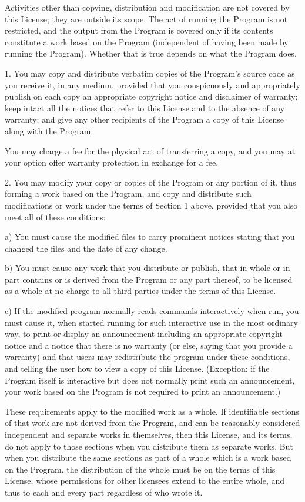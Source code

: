 \documentclass{doc}
\begin{document}
Activities other than copying, distribution and modification are not
covered by this License; they are outside its scope.  The act of
running the Program is not restricted, and the output from the Program
is covered only if its contents constitute a work based on the
Program (independent of having been made by running the Program).
Whether that is true depends on what the Program does.

  1. You may copy and distribute verbatim copies of the Program's
source code as you receive it, in any medium, provided that you
conspicuously and appropriately publish on each copy an appropriate
copyright notice and disclaimer of warranty; keep intact all the
notices that refer to this License and to the absence of any warranty;
and give any other recipients of the Program a copy of this License
along with the Program.

You may charge a fee for the physical act of transferring a copy, and
you may at your option offer warranty protection in exchange for a fee.

  2. You may modify your copy or copies of the Program or any portion
of it, thus forming a work based on the Program, and copy and
distribute such modifications or work under the terms of Section 1
above, provided that you also meet all of these conditions:

    a) You must cause the modified files to carry prominent notices
    stating that you changed the files and the date of any change.

    b) You must cause any work that you distribute or publish, that in
    whole or in part contains or is derived from the Program or any
    part thereof, to be licensed as a whole at no charge to all third
    parties under the terms of this License.

    c) If the modified program normally reads commands interactively
    when run, you must cause it, when started running for such
    interactive use in the most ordinary way, to print or display an
    announcement including an appropriate copyright notice and a
    notice that there is no warranty (or else, saying that you provide
    a warranty) and that users may redistribute the program under
    these conditions, and telling the user how to view a copy of this
    License.  (Exception: if the Program itself is interactive but
    does not normally print such an announcement, your work based on
    the Program is not required to print an announcement.)

These requirements apply to the modified work as a whole.  If
identifiable sections of that work are not derived from the Program,
and can be reasonably considered independent and separate works in
themselves, then this License, and its terms, do not apply to those
sections when you distribute them as separate works.  But when you
distribute the same sections as part of a whole which is a work based
on the Program, the distribution of the whole must be on the terms of
this License, whose permissions for other licensees extend to the
entire whole, and thus to each and every part regardless of who wrote it.
\end{document}
